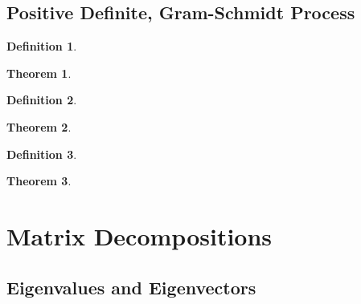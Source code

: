 \documentclass[12pt,openany]{book}
\newtheorem{theorem}{Theorem}[chapter]
\theoremstyle{definition}
\newtheorem{definition}{Definition}[chapter]
\begin{document}
	\newpage
	\section{Positive Definite, Gram-Schmidt Process}
	
	\begin{tcolorbox}[colframe=defcolor,title={\color{white}\bf }]
		\begin{definition}
			
		\end{definition}
	\end{tcolorbox}
	\begin{tcolorbox}[colframe=thmcolor,title={\color{white}\bf }]
		\begin{theorem}
			
		\end{theorem}
	\end{tcolorbox}
	
	\begin{tcolorbox}[colframe=defcolor,title={\color{white}\bf }]
		\begin{definition}
			
		\end{definition}
	\end{tcolorbox}
	\begin{tcolorbox}[colframe=thmcolor,title={\color{white}\bf }]
		\begin{theorem}
			
		\end{theorem}
	\end{tcolorbox}

	\begin{tcolorbox}[colframe=defcolor,title={\color{white}\bf }]
		\begin{definition}
			
		\end{definition}
	\end{tcolorbox}
	\begin{tcolorbox}[colframe=thmcolor,title={\color{white}\bf }]
		\begin{theorem}
			
		\end{theorem}
	\end{tcolorbox}
	
	\chapter{Matrix Decompositions}
	\section{Eigenvalues and Eigenvectors}
\end{document}
